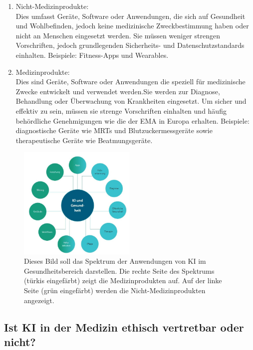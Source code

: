 \documentclass{article}
\begin{document}
\begin{enumerate}
\item Nicht-Medizinprodukte:\\ Dies umfasst Geräte, Software oder Anwendungen, die sich
auf Gesundheit und Wohlbefinden, jedoch keine medizinische Zweckbestimmung haben oder nicht an Menschen 
eingesetzt werden. Sie müssen weniger strengen Vorschriften, jedoch grundlegenden Sicherheits- und Datenschutzstandards
einhalten. Beispiele: Fitness-Apps und Wearables.
\item Medizinprodukte: \\Dies sind Geräte, Software oder Anwendungen die speziell für medizinische Zwecke 
entwickelt und verwendet werden.Sie werden zur Diagnose, Behandlung oder Überwachung von Krankheiten eingesetzt.
Um sicher und effektiv zu sein, müssen sie strenge Vorschriften einhalten und häufig behördliche Genehmigungen wie die der EMA 
in Europa erhalten. Beispiele: diagnostische Geräte wie MRTs und Blutzuckermessgeräte sowie therapeutische Geräte
wie Beatmungsgeräte.
\end{enumerate}

\begin{figure}[H]
    \centering
    \includegraphics[width=0.5\textwidth]{Bild13.jpg}
    \caption{Dieses Bild soll das Spektrum der Anwendungen von KI im Gesundheitsbereich darstellen. Die rechte Seite des Spektrums (türkis eingefärbt)
    zeigt die Medizinprodukten auf. Auf der linke Seite (grün eingefärbt) werden die Nicht-Medizinprodukten angezeigt.}
    \label{fig:Bildmedizin}
\end{figure}

\newpage
\subsection {Ist KI in der Medizin ethisch vertretbar oder nicht?}
\end{document}
